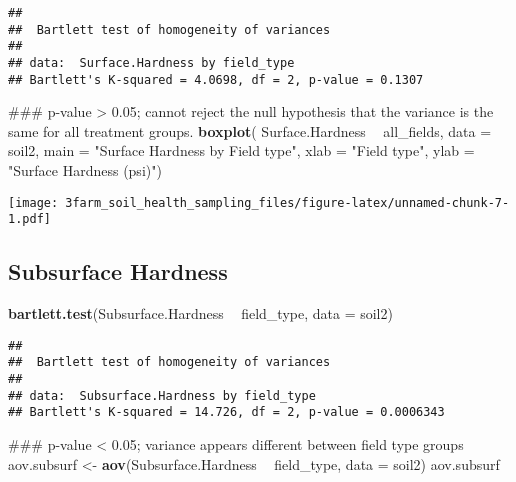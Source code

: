 \documentclass[]{article}
\newenvironment{Shaded}{\begin{snugshade}}{\end{snugshade}}
\newcommand{\KeywordTok}[1]{\textcolor[rgb]{0.13,0.29,0.53}{\textbf{#1}}}
\newcommand{\DataTypeTok}[1]{\textcolor[rgb]{0.13,0.29,0.53}{#1}}
\newcommand{\StringTok}[1]{\textcolor[rgb]{0.31,0.60,0.02}{#1}}
\newcommand{\OperatorTok}[1]{\textcolor[rgb]{0.81,0.36,0.00}{\textbf{#1}}}
\newcommand{\NormalTok}[1]{#1}
\begin{document}
\begin{verbatim}
## 
##  Bartlett test of homogeneity of variances
## 
## data:  Surface.Hardness by field_type
## Bartlett's K-squared = 4.0698, df = 2, p-value = 0.1307
\end{verbatim}

\begin{Shaded}
\begin{Highlighting}[]
\NormalTok{### p-value > 0.05; cannot reject the null hypothesis that the variance is the same for all treatment groups.}
\KeywordTok{boxplot}\NormalTok{( Surface.Hardness }\OperatorTok{~}\StringTok{ }\NormalTok{all_fields, }\DataTypeTok{data =}\NormalTok{ soil2, }\DataTypeTok{main =} \StringTok{"Surface Hardness by Field type"}\NormalTok{, }\DataTypeTok{xlab =} \StringTok{"Field type"}\NormalTok{, }\DataTypeTok{ylab =} \StringTok{"Surface Hardness (psi)"}\NormalTok{)}
\end{Highlighting}
\end{Shaded}

\texttt{[image: 3farm\_soil\_health\_sampling\_files/figure-latex/unnamed-chunk-7-1.pdf]}

\subsection{Subsurface Hardness}\label{subsurface-hardness}

\begin{Shaded}
\begin{Highlighting}[]
\KeywordTok{bartlett.test}\NormalTok{(Subsurface.Hardness }\OperatorTok{~}\StringTok{ }\NormalTok{field_type, }\DataTypeTok{data =}\NormalTok{ soil2)}
\end{Highlighting}
\end{Shaded}

\begin{verbatim}
## 
##  Bartlett test of homogeneity of variances
## 
## data:  Subsurface.Hardness by field_type
## Bartlett's K-squared = 14.726, df = 2, p-value = 0.0006343
\end{verbatim}

\begin{Shaded}
\begin{Highlighting}[]
\NormalTok{### p-value < 0.05; variance appears different between field type groups}
\NormalTok{aov.subsurf <-}\StringTok{ }\KeywordTok{aov}\NormalTok{(Subsurface.Hardness }\OperatorTok{~}\StringTok{ }\NormalTok{field_type, }\DataTypeTok{data =}\NormalTok{ soil2)}
\NormalTok{aov.subsurf}
\end{Highlighting}
\end{Shaded}
\end{document}
